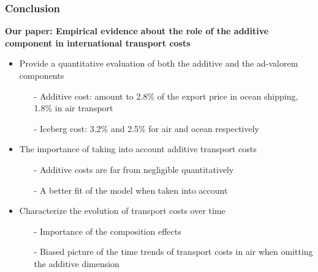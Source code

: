 \documentclass[10 pt,Helvetica, french]{beamer}
\begin{document}
\begin{frame}
\frametitle{Conclusion}
\textbf{Our paper: Empirical evidence about the role of the additive component in international transport costs} \vspace{0.1cm}
\begin{itemize}
\item Provide a quantitative evaluation of both the additive and the ad-valorem components \vspace{0.1cm}
\begin{itemize}
\item[-] Additive cost: amount to 2.8\% of the export price in ocean shipping, 1.8\% in air transport \vspace{0.1cm}
\item[-] Iceberg cost: 3.2\% and 2.5\% for air and ocean respectively \vspace{0.1cm}
\end{itemize}
\item The importance of taking into account additive transport costs \vspace{0.1cm}
\begin{itemize}
\item[-] Additive costs are far from negligible quantitatively \vspace{0.1cm}
\item[-] A better fit of the model when taken into account    \vspace{0.1cm}
\end{itemize}
\item Characterize the evolution of transport costs over time \vspace{0.1cm}
\begin{itemize}
\item[-] Importance of the composition effects \vspace{0.1cm}
\item[-] Biased picture of the time trends of transport costs in air when omitting the additive dimension
\end{itemize}
\end{itemize}

\end{frame}
\end{document}
